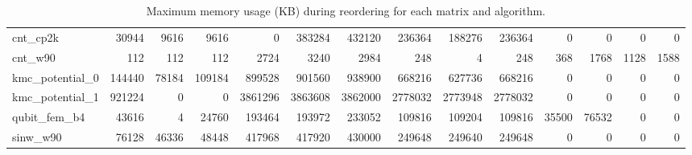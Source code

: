 \begin{sidewaystable}
{\begin{tabular}{ l r r r r r r r r r r r r r }
      cnt\_cp2k & 30944 & 9616 & 9616 & 0 & 383284 & 432120 & 236364 & 188276 & 236364 & 0 & 0 & 0 & 0 \\
      cnt\_w90 & 112 & 112 & 112 & 2724 & 3240 & 2984 & 248 & 4 & 248 & 368 & 1768 & 1128 & 1588 \\
      kmc\_potential\_0 & 144440 & 78184 & 109184 & 899528 & 901560 & 938900 & 668216 & 627736 & 668216 & 0 & 0 & 0 & 0 \\
      kmc\_potential\_1 & 921224 & 0 & 0 & 3861296 & 3863608 & 3862000 & 2778032 & 2773948 & 2778032 & 0 & 0 & 0 & 0 \\
      qubit\_fem\_b4 & 43616 & 4 & 24760 & 193464 & 193972 & 233052 & 109816 & 109204 & 109816 & 35500 & 76532 & 0 & 0 \\
      sinw\_w90 & 76128 & 46336 & 48448 & 417968 & 417920 & 430000 & 249648 & 249640 & 249648 & 0 & 0 & 0 & 0 \\
      \bottomrule
    \end{tabular}
    }%
    \caption{Maximum memory usage (KB) during reordering for each matrix and algorithm.}%
    \label{tbl:reorder_max_memory_results}
\end{sidewaystable}

\clearpage


